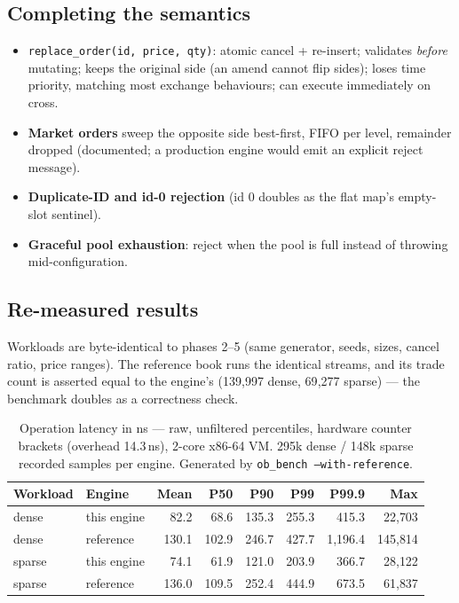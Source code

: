 \documentclass[11pt,a4paper]{article}
\begin{document}
\subsection{Completing the semantics}

\begin{itemize}
\item \texttt{replace\_order(id, price, qty)}: atomic cancel + re-insert;
      validates \emph{before} mutating; keeps the original side (an amend
      cannot flip sides); loses time priority, matching most exchange
      behaviours; can execute immediately on cross.
\item \textbf{Market orders} sweep the opposite side best-first, FIFO per
      level, remainder dropped (documented; a production engine would emit
      an explicit reject message).
\item \textbf{Duplicate-ID and id-0 rejection} (id 0 doubles as the flat
      map's empty-slot sentinel).
\item \textbf{Graceful pool exhaustion}: reject when the pool is full
      instead of throwing mid-configuration.
\end{itemize}

\subsection{Re-measured results}

Workloads are byte-identical to phases 2--5 (same generator, seeds,
sizes, cancel ratio, price ranges). The reference book runs the identical
streams, and its trade count is asserted equal to the engine's
(139{,}997 dense, 69{,}277 sparse) --- the benchmark doubles as a
correctness check.

\begin{table}[h]
\centering
\begin{tabular}{llrrrrrr}
\toprule
Workload & Engine & Mean & P50 & P90 & P99 & P99.9 & Max \\
\midrule
dense  & this engine & 82.2 & 68.6 & 135.3 & 255.3 & 415.3 & 22{,}703 \\
dense  & reference   & 130.1 & 102.9 & 246.7 & 427.7 & 1{,}196.4 & 145{,}814 \\
\addlinespace
sparse & this engine & 74.1 & 61.9 & 121.0 & 203.9 & 366.7 & 28{,}122 \\
sparse & reference   & 136.0 & 109.5 & 252.4 & 444.9 & 673.5 & 61{,}837 \\
\bottomrule
\end{tabular}
\caption{Operation latency in ns --- raw, unfiltered percentiles, hardware
counter brackets (overhead 14.3\,ns), 2-core x86-64 VM. 295k dense /
148k sparse recorded samples per engine. Generated by \texttt{ob\_bench
--with-reference}.}
\label{tab:sixth}
\end{table}
\end{document}
